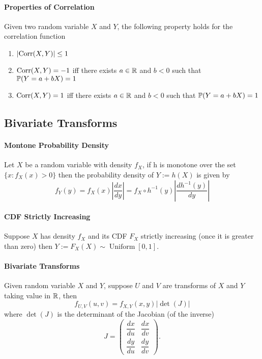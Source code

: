 \paragraph{Properties of Correlation}
Given two random variable \(X\) and \(Y\), the following property holds for the correlation function
\begin{enumerate}
    \item \(|\mathrm{Corr}(X,Y)| \leq 1\)
    \item \(\mathrm{Corr}(X,Y) = -1\) iff there exists \(a \in \mathbb{R}\) and \(b < 0\) such that \(\mathbb{P}(Y = a + bX) = 1\)
    \item \(\mathrm{Corr}(X,Y) = 1\) iff there exists \(a \in \mathbb{R}\) and \(b < 0\) such that \(\mathbb{P}(Y = a + bX) = 1\)
\end{enumerate}

\subsection{Bivariate Transforms}
\paragraph{Montone Probability Density}
Let \(X\) be a random variable with density \(f_X\), if h is monotone over the set \(\{ x: f_X(x) > 0 \}\) then the probability density of \(Y := h(X)\) is given by 
\[f_Y(y) = f_X(x) \left| \frac{dx}{dy} \right| = f_X \circ h^{-1}(y) \left|\frac{dh^{-1}(y)}{dy} \right|\]

\paragraph{CDF Strictly Increasing}
Suppose \(X\) has density \(f_X\) and its CDF \(F_X\) strictly increasing (once it is greater than zero) then \(Y := F_X(X) \sim \operatorname{Uniform}[0,1]\).

\paragraph{Bivariate Transforms}
Given random variable \(X\) and \(Y\), suppose \(U\) and \(V\) are transforms of \(X\) and \(Y\) taking value in \(\mathbb{R}\), then
\[f_{U,V}(u,v) = f_{X,Y}(x,y)|\det(J)|\]
where \(\det(J)\) is the determinant of the Jacobian (of the inverse)
\[J = \begin{pmatrix}
    \dfrac{dx}{du} & \dfrac{dx}{dv} \\
    \dfrac{dy}{du} & \dfrac{dy}{dv}
\end{pmatrix}
.\]

